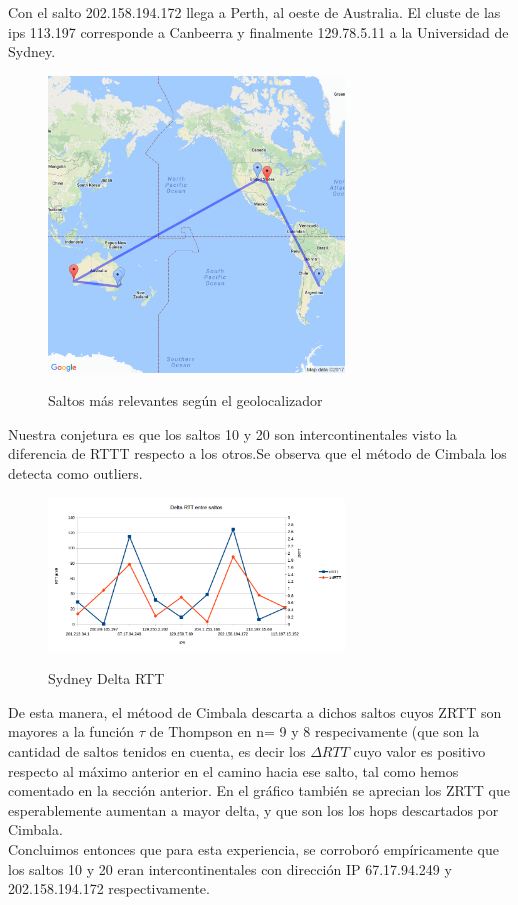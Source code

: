 Con el salto 202.158.194.172 llega a Perth, al oeste de Australia. 
 El cluste de las ips 113.197 corresponde a Canbeerra y finalmente 129.78.5.11 a la Universidad de Sydney.\\


\begin{figure}[H]
\centering
\caption{Saltos más relevantes según el geolocalizador}
\includegraphics[width=0.7\textwidth]{modules/asia_mapa}
 \label{fig:dysney_mapa}
\end{figure}

Nuestra conjetura es que los saltos 10 y 20 son intercontinentales visto la diferencia de RTTT respecto a los otros.Se observa que el método de Cimbala los detecta como outliers.

\begin{figure}[H]
\centering
\caption{Sydney Delta RTT}
\includegraphics[width=0.7\textwidth]{modules/asia_delta}
 \label{fig:dysney_rtts}
\end{figure}

De esta manera, el métood de Cimbala descarta a dichos saltos cuyos 
ZRTT son mayores a la función $\tau$ de Thompson en n= 9 y 8 
respecivamente (que son la cantidad de saltos tenidos en cuenta, es 
decir los $\Delta RTT$ cuyo valor es positivo respecto al máximo 
anterior en el camino hacia ese salto, tal como hemos comentado en la 
sección anterior.
En el gráfico también se aprecian los ZRTT que esperablemente aumentan a mayor delta, y que son los los hops descartados por Cimbala.\\
Concluimos entonces que para esta experiencia, se corroboró empíricamente que los saltos 10 y 20 eran intercontinentales con dirección IP 67.17.94.249 y 202.158.194.172 respectivamente.
 






